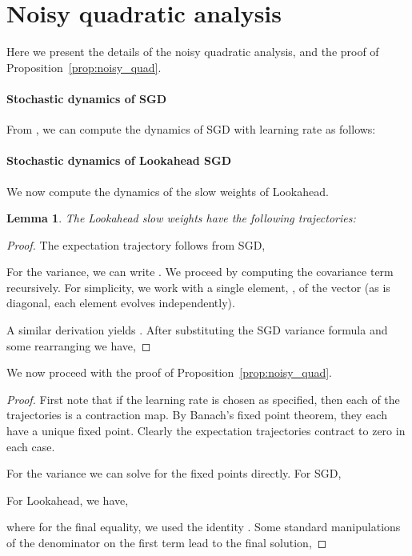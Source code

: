 \documentclass{article}
\newtheorem{lemma}{Lemma}
\begin{document}
\appendix
\section{Noisy quadratic analysis}
\label{app:noisy}
Here we present the details of the noisy quadratic analysis, and the proof of Proposition~\ref{prop:noisy_quad}.

\paragraph{Stochastic dynamics of SGD} From \citet{wu2018understanding}, we can compute the dynamics of SGD with learning rate  as follows:



\paragraph{Stochastic dynamics of Lookahead SGD} We now compute the dynamics of the slow weights of Lookahead.

\begin{lemma}The Lookahead slow weights have the following trajectories:


\end{lemma}

\begin{proof}
The expectation trajectory follows from SGD,


For the variance, we can write . We proceed by computing the covariance term recursively. For simplicity, we work with a single element, , of the vector  (as  is diagonal, each element evolves independently).

A similar derivation yields . After substituting the SGD variance formula and some rearranging we have,

\end{proof}
We now proceed with the proof of Proposition~\ref{prop:noisy_quad}.

\begin{proof}
First note that if the learning rate is chosen as specified, then each of the trajectories is a contraction map. By Banach's fixed point theorem, they each have a unique fixed point. Clearly the expectation trajectories contract to zero in each case.

For the variance we can solve for the fixed points directly. For SGD,


For Lookahead, we have,


where for the final equality, we used the identity . Some standard manipulations of the denominator on the first term lead to the final solution,

\end{proof}
\end{document}
